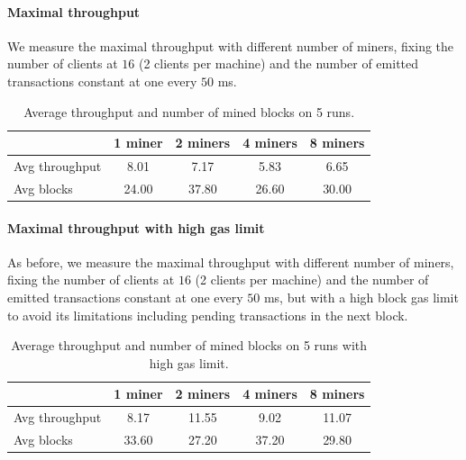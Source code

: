 \paragraph{Maximal throughput}
\label{sec:max-troughput}
We measure the maximal throughput with different number of miners, fixing the
number of clients at $16$ (2 clients per machine) and the number of emitted
transactions constant at one every $50$ ms. 

\begin{table}[h]
  \centering
  \begin{tabular}{lcccc}
    \hline
    & 1 miner & 2 miners & 4 miners & 8 miners \\ \hline
    Avg throughput & 8.01 & 7.17 & 5.83 & 6.65 \\ \hline
    Avg blocks & 24.00 & 37.80 & 26.60 & 30.00 \\ \hline
  \end{tabular}
  \caption{Average throughput and number of mined blocks on 5 runs.}
  \label{tab:max-troughput}
\end{table}


\paragraph{Maximal throughput with high gas limit}
\label{sec:max-throughput-high-gaslimit}
As before, we measure the maximal throughput with different number of miners,
fixing the number of clients at $16$ (2 clients per machine) and the number of
emitted transactions constant at one every $50$ ms, but with a high block gas
limit to avoid its limitations including pending transactions in the next block.

\begin{table}[h]
  \centering
  \begin{tabular}{lcccc}
    \hline
    & 1 miner & 2 miners & 4 miners & 8 miners \\ \hline
    Avg throughput & 8.17 & 11.55 & 9.02 & 11.07 \\ \hline
    Avg blocks & 33.60 & 27.20 & 37.20 & 29.80 \\ \hline
  \end{tabular}
  \caption{Average throughput and number of mined blocks on 5 runs with high gas limit.}
  \label{tab:max-troughput-high-gaslimit}
\end{table}
